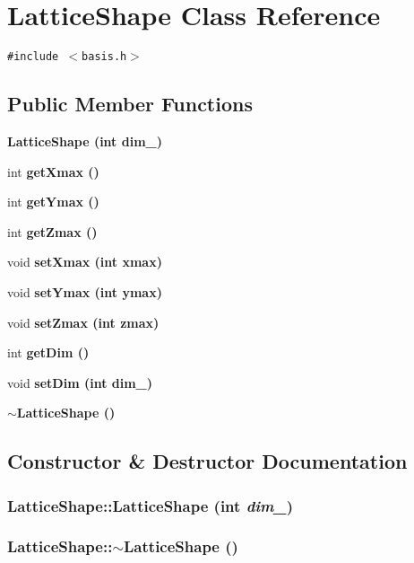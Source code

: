 \section{Lattice\-Shape Class Reference}
\label{classLatticeShape}
{\tt \#include $<$basis.h$>$}

\subsection*{Public Member Functions}
\begin{CompactItemize}
\item 
\bf{Lattice\-Shape} (int dim\_\-)
\item 
int \bf{get\-Xmax} ()
\item 
int \bf{get\-Ymax} ()
\item 
int \bf{get\-Zmax} ()
\item 
void \bf{set\-Xmax} (int xmax)
\item 
void \bf{set\-Ymax} (int ymax)
\item 
void \bf{set\-Zmax} (int zmax)
\item 
int \bf{get\-Dim} ()
\item 
void \bf{set\-Dim} (int dim\_\-)
\item 
\bf{$\sim$Lattice\-Shape} ()
\end{CompactItemize}


\subsection{Constructor \& Destructor Documentation}
\subsubsection{\setlength{\rightskip}{0pt plus 5cm}Lattice\-Shape::Lattice\-Shape (int {\em dim\_\-})\hspace{0.3cm}{\tt  [inline]}}\label{classLatticeShape_5ba5e963c10bad13bf519d3cced6b0fc}


\subsubsection{\setlength{\rightskip}{0pt plus 5cm}Lattice\-Shape::$\sim$Lattice\-Shape ()\hspace{0.3cm}{\tt  [inline]}}\label{classLatticeShape_de33f4dc95ea9173406c9d1c2d42595e}




